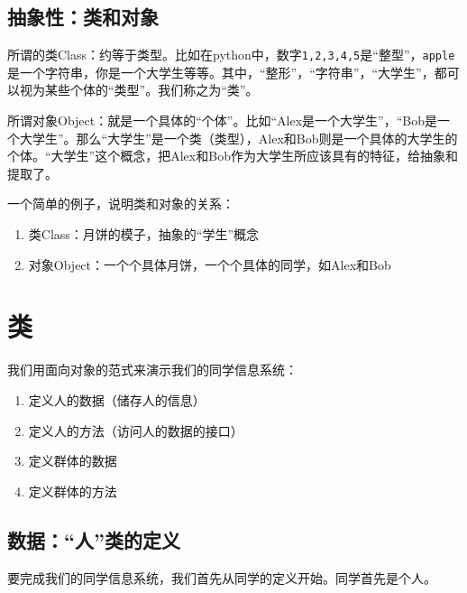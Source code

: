 \documentclass[
  letterpaper,
  DIV=11,
  numbers=noendperiod]{scrreprt}
\providecommand{\tightlist}{%
  \setlength{\itemsep}{0pt}\setlength{\parskip}{0pt}}\usepackage{longtable,booktabs,array}
\begin{document}
\hypertarget{ux62bdux8c61ux6027ux7c7bux548cux5bf9ux8c61}{%
\subsection{抽象性：类和对象}\label{ux62bdux8c61ux6027ux7c7bux548cux5bf9ux8c61}}

所谓的类Class：约等于类型。比如在python中，数字\texttt{1,2,3,4,5}是``整型''，\texttt{\textquotesingle{}apple\textquotesingle{}}是一个字符串，你是一个大学生等等。其中，``整形''，``字符串''，``大学生''，都可以视为某些个体的``类型''。我们称之为``类''。

所谓对象Object：就是一个具体的``个体''。比如``Alex是一个大学生''，``Bob是一个大学生''。那么``大学生''是一个类（类型），Alex和Bob则是一个具体的大学生的个体。``大学生''这个概念，把Alex和Bob作为大学生所应该具有的特征，给抽象和提取了。

一个简单的例子，说明类和对象的关系：

\begin{enumerate}
\def\labelenumi{\arabic{enumi}.}
\tightlist
\item
  类Class：月饼的模子，抽象的``学生''概念
\item
  对象Object：一个个具体月饼，一个个具体的同学，如Alex和Bob
\end{enumerate}

\hypertarget{ux7c7b}{%
\section{类}\label{ux7c7b}}

我们用面向对象的范式来演示我们的同学信息系统：

\begin{enumerate}
\def\labelenumi{\arabic{enumi}.}
\tightlist
\item
  定义人的数据（储存人的信息）
\item
  定义人的方法（访问人的数据的接口）
\item
  定义群体的数据
\item
  定义群体的方法
\end{enumerate}

\hypertarget{ux6570ux636eux4ebaux7c7bux7684ux5b9aux4e49}{%
\subsection{数据：``人''类的定义}\label{ux6570ux636eux4ebaux7c7bux7684ux5b9aux4e49}}

要完成我们的同学信息系统，我们首先从同学的定义开始。同学首先是个人。
\end{document}
